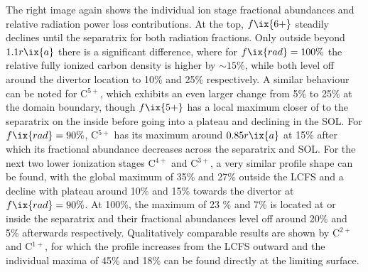         The right image again shows the individual ion stage fractional abundances and relative radiation power loss contributions. At the top, $f\ix{6+}$ steadily declines until the separatrix for both radiation fractions. Only outside beyond $1.1r\ix{a}$ there is a significant difference, where for $f\ix{rad}=100\%$ the relative fully ionized carbon density is higher by $\sim15\%$, while both level off around the divertor location to 10\% and 25\% respectively. A similar behaviour can be noted for C$^{5+}$, which exhibits an even larger change from 5\% to 25\% at the domain boundary, though $f\ix{5+}$ has a local maximum closer of to the separatrix on the inside before going into a plateau and declining in the SOL. For $f\ix{rad}=90\%$, C$^{5+}$ has its maximum around $0.85r\ix{a}$ at 15\% after which its fractional abundance decreases across the separatrix and SOL. For the next two lower ionization stages C$^{4+}$ and C$^{3+}$, a very similar profile shape can be found, with the global maximum of 35\% and 27\% outside the LCFS and a decline with plateau around 10\% and 15\% towards the divertor at $f\ix{rad}=90\%$. At 100\%, the maximum of 23
        \% and 7\% is located at or inside the separatrix and their fractional abundances level off around 20\% and 5\% afterwards respectively. Qualitatively comparable results are shown by C$^{2+}$ and C$^{1+}$, for which the profile increases from the LCFS outward and the individual maxima of 45\% and 18\% can be found directly at the limiting surface.\\%
